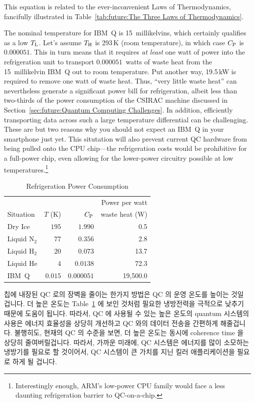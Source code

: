 This equation is related to the ever-inconvenient Laws of Thermodynamics,
fancifully illustrated in
Table~\ref{tab:future:The Three Laws of Thermodynamics}.

The nominal temperature for IBM~Q is 15~millikelvins, which certainly
qualifies as a low $T_\mathrm{L}$.
Let's assume $T_\mathrm{H}$ is 293\,K (room temperature),
in which case $C_\mathrm{P}$ is $0.000051$.
This in turn means that it requires \emph{at least} one watt of
power into the refrigeration unit to transport $0.000051$~watts
of waste heat from the 15~millikelvin IBM~Q out to room temperature.
Put another way, 19.5\,kW is required to remove one watt of waste heat.
Thus, ``very little waste heat'' can nevertheless generate a significant
power bill for refrigeration, albeit less than two-thirds of the power
consumption of the CSIRAC machine discussed in
Section~\ref{sec:future:Quantum Computing Challenges}.
In addition, efficiently transporting data across such a large
temperature differential can be challenging.
These are but two reasons why you should not expect an IBM~Q in your
smartphone just yet.
This situtation will also prevent current QC hardware from being pulled
onto the CPU chip---the refrigeration costs would be prohibitive for
a full-power chip, even allowing for the lower-power circuitry possible
at low temperatures.\footnote{
	Interestingly enough, ARM's low-power CPU family would face
	a less daunting refrigeration barrier to QC-on-a-chip.}
\fi

\begin{table}
\centering\footnotesize
\begin{tabular}{l|r|r|r}
	&	&	& Power per watt \\
Situation
	& $T$ (K)
		& $C_\mathrm{P}$ & waste heat (W) \\
\hline
\hline
Dry Ice
	& $195$
		& $1.990$
			& 0.5 \\
\hline
Liquid N$_2$
	& $77$
		& $0.356$
			& 2.8 \\
\hline
Liquid H$_2$
	& $20$
		& $0.073$
			& 13.7 \\
\hline
Liquid He
	& $4$
		& $0.0138$
			& 72.3 \\
\hline
IBM~Q	& $0.015$
		& $0.000051$
			& 19,500.0 \\
\end{tabular}
\caption{Refrigeration Power Consumption}
\label{tab:future:Refrigeration Power Consumption}
\end{table}

칩에 내장된 QC 로의 장벽을 줄이는 한가지 방법은 QC 의 운영 온도를 높이는 것일
겁니다.
더 높은 온도는
Table~\ref{tab:future:Refrigeration Power Consumption} 에 보인 것처럼
필요한 냉방전력을 극적으로 낮추기 때문에 도움이 됩니다.
따라서, QC 에 사용될 수 있는 높은 온도의 quantum 시스템의 사용은 에너지
효율성을 상당히 개선하고 QC 와의 데이터 전송을 간편하게 해줄겁니다.
불행히도, 현재의 QC 의 수준을 보면, 더 높은 온도는 동시에 coherence time 을
상당히 줄여버릴겁니다.
따라서, 가까운 미래에, QC 시스템은 에너지를 많이 소모하는 냉방기를 필요로 할
것이어서, QC 시스템이 큰 가치를 지닌 킬러 애플리케이션을 필요로 하게 될 겁니다.
\iffalse

